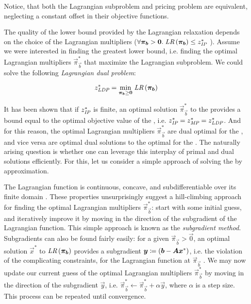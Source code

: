 Notice, that both the Lagrangian subproblem and pricing problem are equivalent, neglecting a constant offset in their objective functions.

The quality of the lower bound provided by the Lagrangian relaxation depends on the choice of the Lagrangian multipliers ($\forall \vec{\pi}_\vec{b} > \vec{0}. \; \LR{\vec{\pi}_\vec{b}} \leq z^*_\IP{}$ \cite{thebook}). Assume we were interested in finding the greatest lower bound, i.e. finding the optimal Lagrangian multipliers $\vec{\pi}_\vec{b}^*$ that maximize the Lagrangian subproblem. We could solve the following \textit{Lagrangian dual problem}:

\begin{equation*}
z^*_\LDP{} = \underset{\vec{\pi}_\vec{b} \geq \vec{0}}{\min} \; \LR{\vec{\pi}_\vec{b}}
\end{equation*}

It has been shown that if $z^*_{\textit{IP}}{}$ is finite, an optimal solution $\vec{\pi}_\vec{b}^*$ to the \LDP{} provides a bound equal to the optimal objective value of the \MP{}, i.e. $z^*_{\textit{IP}}{} = z^*_{\textit{MP}}{} = z^*_{\textit{LDP}}{}$. And for this reason, the optimal Lagrangian multipliers $\vec{\pi}_\vec{b}^*$ are dual optimal for the \MP{}, and vice versa are optimal dual solutions to the \MP{} optimal for the \LDP{} \cite{thebook}. The naturally arising question is whether one can leverage this interplay of primal and dual solutions efficiently. For this, let us consider a simple approach of solving the \LDP{} by approximation.

The Lagrangian function \LR{} is continuous, concave, and subdifferentiable over its finite domain \cite{thebook}. These properties unsurprisingly suggest a hill-climbing approach for finding the optimal Lagrangian multipliers $\vec{\pi}_\vec{b}^*$: start with some initial guess, and iteratively improve it by moving in the direction of the subgradient of the Lagrangian function. This simple approach is known as the \textit{subgradient method}. Subgradients can also be found fairly easily: for a given $\vec{\pi}_\vec{b} > \vec{0}$, an optimal solution $\vec{x}^*$ to $\LR{\vec{\pi}_\vec{b}}$ provides a subgradient ${\bm{y}} \coloneqq ({\bm{b}} - {\bm{A}} {\bm{x}}^*)$, i.e. the violation of the complicating constraints, for the Lagrangian function at $\vec{\pi}_\vec{b}$ \cite{thebook}. We may now update our current guess of the optimal Lagrangian multipliers $\vec{\pi}_\vec{b}^*$ by moving in the direction of the subgradient $\vec{y}$, i.e. $\vec{\pi}_\vec{b}^* \leftarrow \vec{\pi}_\vec{b}^* + \alpha \vec{y}$, where $\alpha$ is a step size. This process can be repeated until convergence.

